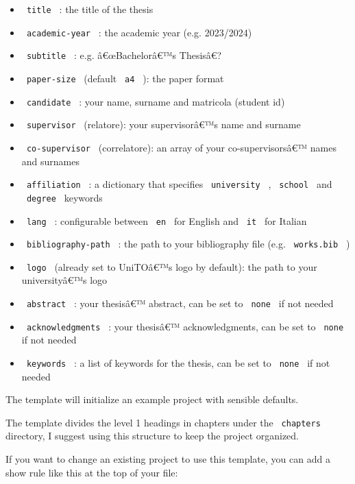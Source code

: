 \begin{itemize}
\tightlist
\item
  \texttt{\ title\ } : the title of the thesis
\item
  \texttt{\ academic-year\ } : the academic year (e.g. 2023/2024)
\item
  \texttt{\ subtitle\ } : e.g. â€œBachelorâ€™s Thesisâ€?
\item
  \texttt{\ paper-size\ } (default \texttt{\ a4\ } ): the paper format
\item
  \texttt{\ candidate\ } : your name, surname and matricola (student id)
\item
  \texttt{\ supervisor\ } (relatore): your supervisorâ€™s name and
  surname
\item
  \texttt{\ co-supervisor\ } (correlatore): an array of your
  co-supervisorsâ€™ names and surnames
\item
  \texttt{\ affiliation\ } : a dictionary that specifies
  \texttt{\ university\ } , \texttt{\ school\ } and \texttt{\ degree\ }
  keywords
\item
  \texttt{\ lang\ } : configurable between \texttt{\ en\ } for English
  and \texttt{\ it\ } for Italian
\item
  \texttt{\ bibliography-path\ } : the path to your bibliography file
  (e.g. \texttt{\ works.bib\ } )
\item
  \texttt{\ logo\ } (already set to UniTOâ€™s logo by default): the path
  to your universityâ€™s logo
\item
  \texttt{\ abstract\ } : your thesisâ€™ abstract, can be set to
  \texttt{\ none\ } if not needed
\item
  \texttt{\ acknowledgments\ } : your thesisâ€™ acknowledgments, can be
  set to \texttt{\ none\ } if not needed
\item
  \texttt{\ keywords\ } : a list of keywords for the thesis, can be set
  to \texttt{\ none\ } if not needed
\end{itemize}

The template will initialize an example project with sensible defaults.

The template divides the level 1 headings in chapters under the
\texttt{\ chapters\ } directory, I suggest using this structure to keep
the project organized.

If you want to change an existing project to use this template, you can
add a show rule like this at the top of your file:

